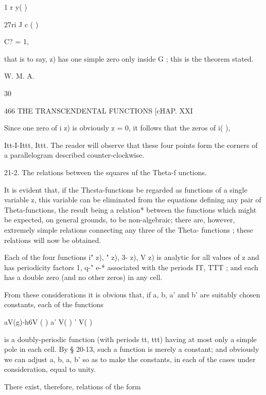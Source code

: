 1 r y( ) 



27ri J c   ( ) 



C?  = 1, 



that is to say,    z) has one simple zero only inside G ; this is the theorem 
stated. 



W. M. A. 



30 



466 THE TRANSCENDENTAL FUNCTIONS [cHAP. XXI 

Since one zero of  i  z) is obviously z = 0, it follows that the zeros of 
 i( ), %

Itt-I-Ittt, Ittt. The reader will observe that these four points form the 
corners of a parallelogram described counter-clockwise. 

21-2. The relations between the squares uf the Theta-f unctions. 

It is evident that, if the Thcsta-functions be regarded as functions of a 
single variable z, this variable can be eliminated from the equations defining 
any pair of Theta-functions, the result being a relation* between the functions 
which might be expected, on general grounds, to be non-algebraic; there 
are, however, extremely simple relations connecting any three of the Theta- 
functions ; these relations will now be obtained. 

Each of the four functions  i"  z), "   z),  3-  z), V  z) is analytic for all 
values of z and has periodicity factors 1, q-" e-*  associated with the periods 
IT, TTT ; and each has a double zero (and no other zeros) in any cell. 

From these considerations it is obvious that, if a, b, a' and b' are suitably 
chosen constants, each of the functions 

aV(g)-h6V ( ) a'%
V( ) ' V( ) 

is a doubly-periodic function (with periods tt, ttt) having at most only a 
simple pole in each cell. By § 20-13, such a function is merely a constant; 
and obviously we can adjust a, b, a, b' so as to make the constants, in each 
of the cases under consideration, equal to unity. 

There exist, therefore, relations of the form 

